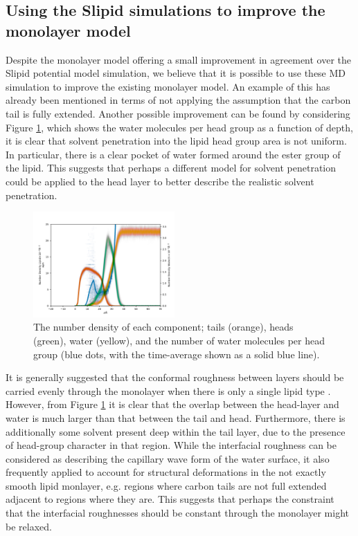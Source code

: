 \documentclass[amsmath,amssymb,twocolumn,superscriptaddress]{revtex4-1}
\begin{document}
\subsection{Using the Slipid simulations to improve the monolayer model}
Despite the monolayer model offering a small improvement in agreement over the Slipid potential model simulation, we believe that it is possible to use these MD simulation to improve the existing monolayer model.
An example of this has already been mentioned in terms of not applying the assumption that the carbon tail is fully extended.
Another possible improvement can be found by considering Figure \ref{fig:nb}, which shows the water molecules per head group as a function of depth, it is clear that solvent penetration into the lipid head group area is not uniform.
In particular, there is a clear pocket of water formed around the ester group of the lipid.
This suggests that perhaps a different model for solvent penetration could be applied to the head layer to better describe the realistic solvent penetration.
%
\begin{figure}
\centering
  \includegraphics[width=0.48\textwidth]{figures/number_density}
  \caption{The number density of each component; tails (orange), heads (green), water (yellow), and the number of water molecules per head group (blue dots, with the time-average shown as a solid blue line).}
  \label{fig:nb}
\end{figure}
%

It is generally suggested that the conformal roughness between layers should be carried evenly through the monolayer when there is only a single lipid type \cite{Campbell2018}.
However, from Figure \ref{fig:nb} it is clear that the overlap between the head-layer and water is much larger than that between the tail and head.
Furthermore, there is additionally some solvent present deep within the tail layer, due to the presence of head-group character in that region.
While the interfacial roughness can be considered as describing the capillary wave form of the water surface, it also frequently applied to account for structural deformations in the not exactly smooth lipid monlayer, e.g. regions where carbon tails are not full extended adjacent to regions where they are.
This suggests that perhaps the constraint that the interfacial roughnesses should be constant through the monolayer might be relaxed.
\end{document}
